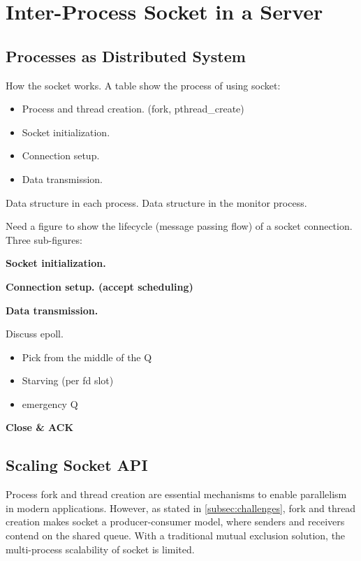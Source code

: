 \section{Inter-Process Socket in a Server}
\label{sec:intra-server}

\subsection{Processes as Distributed System}
\label{subsec:socket-api}

How the socket works. A table show the process of using socket:

\begin{itemize}
	\item Process and thread creation. (fork, pthread\_create)
	\item Socket initialization.
	\item Connection setup.
	\item Data transmission.
\end{itemize}


Data structure in each process. Data structure in the monitor process.

Need a figure to show the lifecycle (message passing flow) of a socket connection. Three sub-figures:


	 \textbf{Socket initialization.}
	  
	 \textbf{Connection setup. (accept scheduling)}
	 
	 \textbf{Data transmission.}
	 
	 Discuss epoll.
\begin{itemize}
	\item Pick from the middle of the Q
	\item Starving (per fd slot)
	\item emergency Q
\end{itemize}

    \textbf{Close \& ACK}


\subsection{Scaling Socket API}
\label{subsec:fork}

Process fork and thread creation are essential mechanisms to enable parallelism in modern applications. 
However, as stated in \ref{subsec:challenges}, fork and thread creation makes socket a producer-consumer model, where senders and receivers contend on the shared queue. With a traditional mutual exclusion solution, the multi-process scalability of socket is limited.

